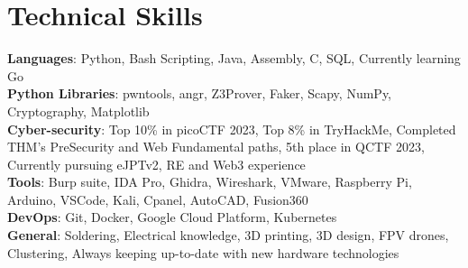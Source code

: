 \section{Technical Skills}

\begin{itemize}[leftmargin=0.15in, label={}]
    \small{\item{
        \textbf{Languages}{: Python, Bash Scripting, Java, Assembly, C, SQL, Currently learning Go} \\ \vspace{2mm}
        \textbf{Python Libraries}{: pwntools, angr, Z3Prover, Faker, Scapy, NumPy, Cryptography, Matplotlib} \\ \vspace{2mm}
        \textbf{Cyber-security}{: Top 10\% in picoCTF 2023, Top 8\% in TryHackMe, Completed THM's PreSecurity and Web Fundamental paths, 5th place in QCTF 2023, Currently pursuing eJPTv2, RE and Web3 experience} \\ \vspace{2mm}
        \textbf{Tools}{: Burp suite, IDA Pro, Ghidra, Wireshark, VMware, Raspberry Pi, Arduino, VSCode, Kali, Cpanel, AutoCAD, Fusion360} \\ \vspace{2mm}
        \textbf{DevOps}{: Git, Docker, Google Cloud Platform, Kubernetes}\\ \vspace{2mm}
        \textbf{General}{: Soldering, Electrical knowledge, 3D printing, 3D design, FPV drones, Clustering, Always keeping up-to-date with new hardware technologies}\\

    }}
\end{itemize}